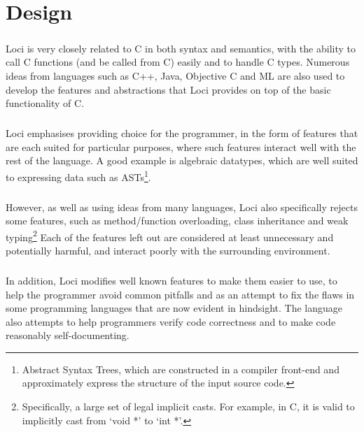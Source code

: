 \documentclass[12pt,twoside,notitlepage]{report}
\begin{document}
\cleardoublepage

\chapter{Design}

\paragraph{}
Loci is very closely related to C in both syntax and semantics, with the ability to call C functions (and be called from C) easily and to handle C types. Numerous ideas from languages such as C++, Java, Objective C and ML are also used to develop the features and abstractions that Loci provides on top of the basic functionality of C.

\paragraph{}
Loci emphasises providing choice for the programmer, in the form of features that are each suited for particular purposes, where such features interact well with the rest of the language. A good example is algebraic datatypes, which are well suited to expressing data such as ASTs\footnote{Abstract Syntax Trees, which are constructed in a compiler front-end and approximately express the structure of the input source code.}.

\paragraph{}
However, as well as using ideas from many languages, Loci also specifically rejects some features, such as method/function overloading, class inheritance and weak typing\footnote{Specifically, a large set of legal implicit casts. For example, in C, it is valid to implicitly cast from `void *' to `int *'.} Each of the features left out are considered at least unnecessary and potentially harmful, and interact poorly with the surrounding environment.

\paragraph{}
In addition, Loci modifies well known features to make them easier to use, to help the programmer avoid common pitfalls and as an attempt to fix the flaws in some programming languages that are now evident in hindsight. The language also attempts to help programmers verify code correctness and to make code reasonably self-documenting.
\end{document}
